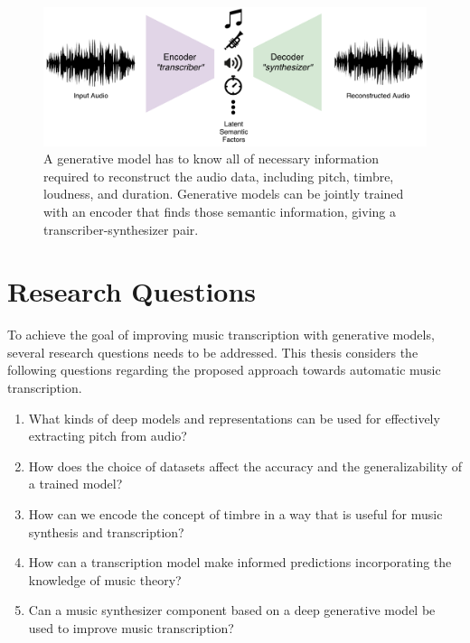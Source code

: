 \begin{figure}[t]
	\includegraphics[width=\textwidth]{autoencoder.pdf}
	\caption{A generative model has to know all of necessary information required to reconstruct the audio data, including pitch, timbre, loudness, and duration. Generative models can be jointly trained with an encoder that finds those semantic information, giving a transcriber-synthesizer pair.}
	\label{fig:autoencoder}
\end{figure}

\section{Research Questions}\label{sec:subproblems}

To achieve the goal of improving music transcription with generative models, several research questions needs to be addressed. This thesis considers the following questions regarding the proposed approach towards automatic music transcription.

\vspace{1em}

\begin{enumerate}
\item What kinds of deep models and representations can be used for effectively extracting pitch from audio?
\item How does the choice of datasets affect the accuracy and the generalizability of a trained model?
\item How can we encode the concept of timbre in a way that is useful for music synthesis and transcription?
\item How can a transcription model make informed predictions incorporating the knowledge of music theory?
\item Can a music synthesizer component based on a deep generative model be used to improve music transcription?
\end{enumerate}

\vspace{1em}

